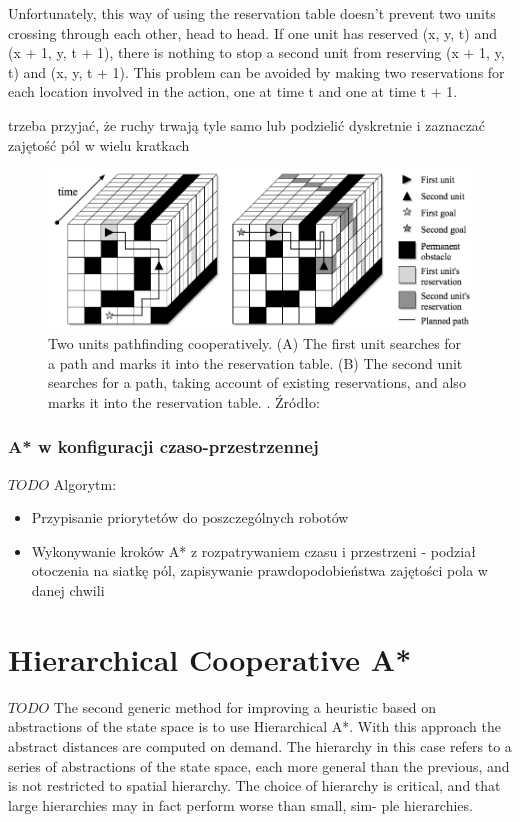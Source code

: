 Unfortunately, this way of using the reservation table doesn’t prevent two units crossing
through each other, head to head. If one unit has reserved (x, y, t) and (x + 1, y, t + 1),
there is nothing to stop a second unit from reserving (x + 1, y, t) and (x, y, t + 1). This
problem can be avoided by making two reservations for each location involved in the
action, one at time t and one at time t + 1.
\cite{cooppath}

trzeba przyjać, że ruchy trwają tyle samo lub podzielić dyskretnie i zaznaczać zajętość pól w wielu kratkach

\begin{figure}[H]
	\centering
	\includegraphics[width=1`0cm]{img/reservation-table}
	\caption{Two units pathfinding cooperatively. (A) The first unit searches for a path and
marks it into the reservation table. (B) The second unit searches for a path, taking account
of existing reservations, and also marks it into the reservation table.
. Źródło: \cite{async_cooppath_spacetime_cp}}
	\label{fig:img_reservation-table}
\end{figure}

\subsubsection{A* w konfiguracji czaso-przestrzennej}
$TODO$
Algorytm:
\begin{itemize}
	\item Przypisanie priorytetów do poszczególnych robotów
	\item Wykonywanie kroków A* z rozpatrywaniem czasu i przestrzeni - podział otoczenia na siatkę pól, zapisywanie prawdopodobieństwa zajętości pola w danej chwili
\end{itemize}

\section{Hierarchical Cooperative A*}
$TODO$
The second generic method for improving a heuristic based on abstractions of the state space is to use Hierarchical A*.
With this approach the abstract distances are computed on demand. The hierarchy in this case refers to a
series of abstractions of the state space, each more general
than the previous, and is not restricted to spatial hierarchy.
The choice of hierarchy is critical, and that
large hierarchies may in fact perform worse than small, sim-
ple hierarchies.

